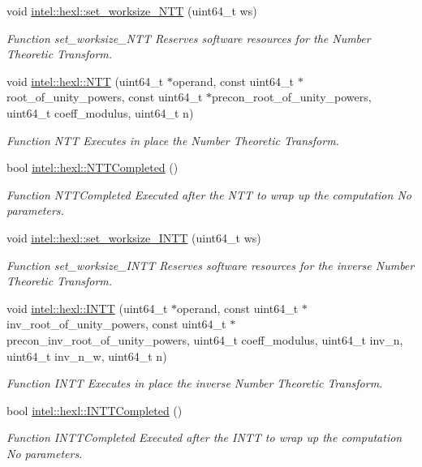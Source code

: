 \begin{DoxyCompactItemize}
void \hyperlink{namespaceintel_1_1hexl_af64feb2684e5467b69273aeb64d73b32}{intel\-::hexl\-::set\-\_\-worksize\-\_\-\-N\-T\-T} (uint64\-\_\-t ws)
\begin{DoxyCompactList}\small\item\em Function set\-\_\-worksize\-\_\-\-N\-T\-T Reserves software resources for the Number Theoretic Transform. \end{DoxyCompactList}\item 
void \hyperlink{namespaceintel_1_1hexl_aba58174859e0cfb87d493606a9e8a530}{intel\-::hexl\-::\-N\-T\-T} (uint64\-\_\-t $\ast$operand, const uint64\-\_\-t $\ast$root\-\_\-of\-\_\-unity\-\_\-powers, const uint64\-\_\-t $\ast$precon\-\_\-root\-\_\-of\-\_\-unity\-\_\-powers, uint64\-\_\-t coeff\-\_\-modulus, uint64\-\_\-t n)
\begin{DoxyCompactList}\small\item\em Function N\-T\-T Executes in place the Number Theoretic Transform. \end{DoxyCompactList}\item 
bool \hyperlink{namespaceintel_1_1hexl_abeacc492f814f3fdf8659bd8067dc732}{intel\-::hexl\-::\-N\-T\-T\-Completed} ()
\begin{DoxyCompactList}\small\item\em Function N\-T\-T\-Completed Executed after the N\-T\-T to wrap up the computation No parameters. \end{DoxyCompactList}\item 
void \hyperlink{namespaceintel_1_1hexl_a5fd09ace83ab47ba6d55eb4fde0973d8}{intel\-::hexl\-::set\-\_\-worksize\-\_\-\-I\-N\-T\-T} (uint64\-\_\-t ws)
\begin{DoxyCompactList}\small\item\em Function set\-\_\-worksize\-\_\-\-I\-N\-T\-T Reserves software resources for the inverse Number Theoretic Transform. \end{DoxyCompactList}\item 
void \hyperlink{namespaceintel_1_1hexl_add1b2b65fe1dc30cfd2683dfb6f4dde6}{intel\-::hexl\-::\-I\-N\-T\-T} (uint64\-\_\-t $\ast$operand, const uint64\-\_\-t $\ast$inv\-\_\-root\-\_\-of\-\_\-unity\-\_\-powers, const uint64\-\_\-t $\ast$precon\-\_\-inv\-\_\-root\-\_\-of\-\_\-unity\-\_\-powers, uint64\-\_\-t coeff\-\_\-modulus, uint64\-\_\-t inv\-\_\-n, uint64\-\_\-t inv\-\_\-n\-\_\-w, uint64\-\_\-t n)
\begin{DoxyCompactList}\small\item\em Function I\-N\-T\-T Executes in place the inverse Number Theoretic Transform. \end{DoxyCompactList}\item 
bool \hyperlink{namespaceintel_1_1hexl_a87e4fb9429d04f09bbb0de8497aab0f7}{intel\-::hexl\-::\-I\-N\-T\-T\-Completed} ()
\begin{DoxyCompactList}\small\item\em Function I\-N\-T\-T\-Completed Executed after the I\-N\-T\-T to wrap up the computation No parameters. \end{DoxyCompactList}\end{DoxyCompactItemize}

